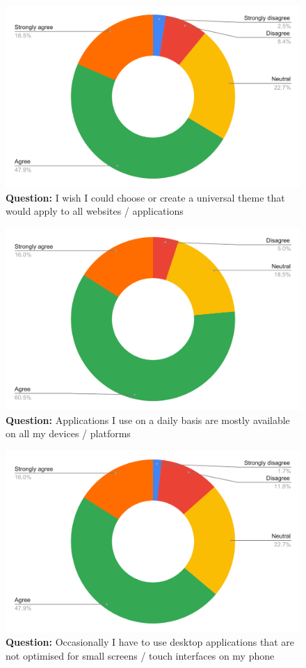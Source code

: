 \begin{figure}[H]
  \centering
  \includegraphics[width=13cm]{thesis/paper/images/p1_q9.pdf}
  \textbf{Question:} I wish I could choose or create a universal theme that would apply to all websites / applications
\end{figure}

\begin{figure}[H]
  \centering
  \includegraphics[width=13cm]{thesis/paper/images/p1_q10.pdf}
  \textbf{Question:} Applications I use on a daily basis are mostly available on all my devices / platforms
\end{figure}

\begin{figure}[H]
  \centering
  \includegraphics[width=13cm]{thesis/paper/images/p1_q11.pdf}
  \textbf{Question:} Occasionally I have to use desktop applications that are not optimised for small screens / touch interfaces on my phone
\end{figure}

